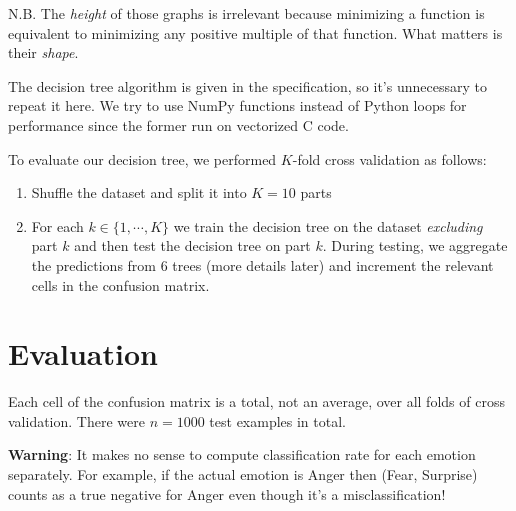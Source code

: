 \documentclass[12pt, a4paper]{article}
\begin{document}
N.B. The \textit{height} of those graphs is irrelevant because minimizing a function is equivalent to minimizing any positive multiple of that function. What matters is their \textit{shape}.\par
\bigskip
The decision tree algorithm is given in the specification, so it's unnecessary to repeat it here. We try to use NumPy functions instead of Python loops for performance since the former run on vectorized C code.\par
\bigskip
To evaluate our decision tree, we performed $K$-fold cross validation as follows:
\begin{enumerate}
    \item Shuffle the dataset and split it into $K = 10$ parts
    \item For each $k \in \{1, \dotsm, K\}$ we train the decision tree on the dataset \textit{excluding} part $k$ and then test the decision tree on part $k$. During testing, we aggregate the predictions from 6 trees (more details later) and increment the relevant cells in the confusion matrix.
\end{enumerate}

\section*{Evaluation}
Each cell of the confusion matrix is a total, not an average, over all folds of cross validation. There were $n = 1000$ test examples in total.\par
\bigskip
\textbf{Warning}: It makes no sense to compute classification rate for each emotion separately. For example, if the actual emotion is Anger then (Fear, Surprise) counts as a true negative for Anger even though it's a misclassification!
\end{document}
